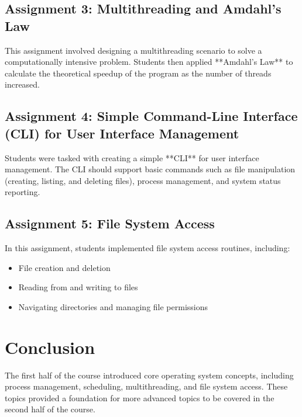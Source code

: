 \documentclass[12pt]{article}
\begin{document}
\subsection{Assignment 3: Multithreading and Amdahl's Law}
This assignment involved designing a multithreading scenario to solve a computationally intensive problem. Students then applied **Amdahl's Law** to calculate the theoretical speedup of the program as the number of threads increased.

\subsection{Assignment 4: Simple Command-Line Interface (CLI) for User Interface Management}
Students were tasked with creating a simple **CLI** for user interface management. The CLI should support basic commands such as file manipulation (creating, listing, and deleting files), process management, and system status reporting.

\subsection{Assignment 5: File System Access}
In this assignment, students implemented file system access routines, including:
\begin{itemize}
    \item File creation and deletion
    \item Reading from and writing to files
    \item Navigating directories and managing file permissions
\end{itemize}

\section{Conclusion}
The first half of the course introduced core operating system concepts, including process management, scheduling, multithreading, and file system access. These topics provided a foundation for more advanced topics to be covered in the second half of the course.
\end{document}
